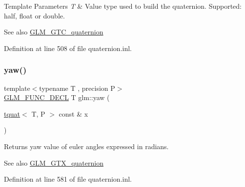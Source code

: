 \begin{DoxyTemplParams}{Template Parameters}
{\em T} & Value type used to build the quaternion. Supported\+: half, float or double. \\
\hline
\end{DoxyTemplParams}
\begin{DoxySeeAlso}{See also}
\mbox{\hyperlink{group__gtc__quaternion}{G\+L\+M\+\_\+\+G\+T\+C\+\_\+quaternion}} 
\end{DoxySeeAlso}


Definition at line 508 of file quaternion.\+inl.

\mbox{\label{group__gtc__quaternion_ga724a5df282b70cec0a6cb0d6dcddb6d6}} 
\subsubsection{\texorpdfstring{yaw()}{yaw()}}
{\footnotesize\ttfamily template$<$typename T , precision P$>$ \\
\mbox{\hyperlink{setup_8hpp_ab2d052de21a70539923e9bcbf6e83a51}{G\+L\+M\+\_\+\+F\+U\+N\+C\+\_\+\+D\+E\+CL}} T glm\+::yaw (\begin{DoxyParamCaption}\item[{\mbox{\hyperlink{structglm_1_1tquat}{tquat}}$<$ T, P $>$ const \&}]{x }\end{DoxyParamCaption})}

Returns yaw value of euler angles expressed in radians.

\begin{DoxySeeAlso}{See also}
\mbox{\hyperlink{group__gtx__quaternion}{G\+L\+M\+\_\+\+G\+T\+X\+\_\+quaternion}} 
\end{DoxySeeAlso}


Definition at line 581 of file quaternion.\+inl.

